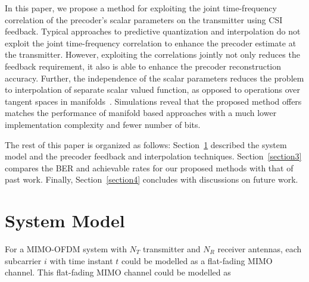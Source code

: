 \documentclass[conference]{IEEEtran}
\begin{document}
In this paper, we propose a method for exploiting the joint time-frequency correlation of the precoder's scalar parameters on the transmitter using CSI feedback. Typical approaches to predictive quantization and interpolation do not exploit the joint time-frequency correlation to enhance the precoder estimate at the transmitter. However, exploiting the correlations jointly not only reduces the feedback requirement, it also is able to enhance the precoder reconstruction accuracy. Further, the independence of the scalar parameters reduces the problem to interpolation of separate scalar valued function, as opposed to operations over tangent spaces in manifolds~\cite{Gupt1905:Predictive}. Simulations reveal that the proposed method offers matches the performance of manifold based approaches with a much lower implementation complexity and fewer number of bits.


The rest of this paper is organized as follows: Section~\ref{section2} described the system model and the precoder feedback and interpolation techniques. Section~\ref{section3} compares the BER and achievable rates for our proposed methods with that of past work. Finally, Section~\ref{section4} concludes with discussions on future work.



  

\section{System Model} 

\label{section2} 

For a MIMO-OFDM system with $N_T$ transmitter and $N_R$ receiver antennas, each subcarrier $i$ with time instant $t$ could be modelled as a flat-fading MIMO channel. This flat-fading MIMO channel could be modelled as 
\end{document}
